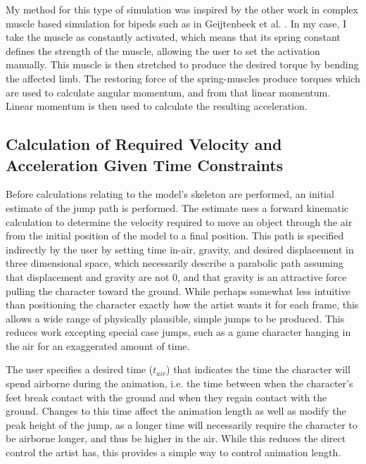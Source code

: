My method for this type of simulation was inspired by the other work in complex muscle based simulation for bipeds such as in Geijtenbeek et al. \cite{muscle_based_bipeds}.  In my case, I take the muscle as constantly activated, which means that its spring constant defines the strength of the muscle, allowing the user to set the activation manually.  This muscle is then stretched to produce the desired torque by bending the affected limb.  The restoring force of the spring-muscles produce torques which are used to calculate angular momentum, and from that linear momentum.  Linear momentum is then used to calculate the resulting acceleration.

\subsection{Calculation of Required Velocity and Acceleration Given Time Constraints}
\label{subsection:torque_path}
%	

Before calculations relating to the model's skeleton are performed, an initial estimate of the jump path is performed.  The estimate uses a forward kinematic calculation to determine the velocity required to move an object through the air from the initial position of the model to a final position.  This path is specified indirectly by the user by setting time in-air, gravity, and desired displacement in three dimensional space, which necessarily describe a parabolic path assuming that displacement and gravity are not 0, and that gravity is an attractive force pulling the character toward the ground.  While perhaps somewhat less intuitive than positioning the character exactly how the artist wants it for each frame, this allows a wide range of physically plausible, simple jumps to be produced.  This reduces work excepting special case jumps, such as a game character hanging in the air for an exaggerated amount of time.

The user specifies a desired time ($t_{air}$) that indicates the time the character will spend airborne during the animation, i.e. the time between when the character's feet break contact with the ground and when they regain contact with the ground.  Changes to this time affect the animation length as well as modify the peak height of the jump, as a longer time will necessarily require the character to be airborne longer, and thus be higher in the air.  While this reduces the direct control the artist has, this provides a simple way to control animation length.

